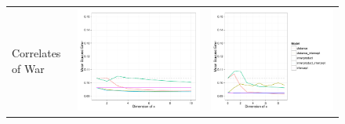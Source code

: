 \begin{figure}
\begin{tabular}{m{2cm}cc}
  \tiny{Correlates of War} \vspace{10pt} & \includegraphics[height=0.25\textheight]{chapter_foreign_relations/figures/008_static_model_results.pdf} & \includegraphics[height=0.25\textheight]{chapter_foreign_relations/figures/009_dynamic_model_results.pdf} \\

\end{tabular}
\end{figure}
